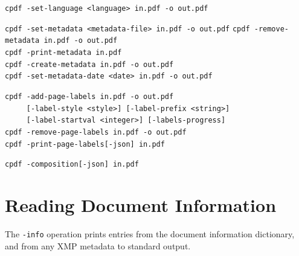\documentclass{book}
\begin{document}
\begin{framed}
    \vspace{1.5mm}
    \small\noindent\verb!cpdf -set-language <language> in.pdf -o out.pdf!

    \vspace{1.5mm}
    \small\noindent\verb!cpdf -set-metadata <metadata-file> in.pdf -o out.pdf!
    \small\noindent\verb!cpdf -remove-metadata in.pdf -o out.pdf!\\
    \small\noindent\verb!cpdf -print-metadata in.pdf!\\
    \small\noindent\verb!cpdf -create-metadata in.pdf -o out.pdf!\\
    \small\noindent\verb!cpdf -set-metadata-date <date> in.pdf -o out.pdf!
    
    \vspace{1.5mm}
    \small\noindent\verb!cpdf -add-page-labels in.pdf -o out.pdf!\\
    \noindent\verb!     [-label-style <style>] [-label-prefix <string>]!\\
    \noindent\verb!     [-label-startval <integer>] [-labels-progress]!\\
    
    \vspace{1.5mm}
    \small\noindent\verb!cpdf -remove-page-labels in.pdf -o out.pdf!\\
    \small\noindent\verb!cpdf -print-page-labels[-json] in.pdf!

    \vspace{1.5mm}
    \small\noindent\verb!cpdf -composition[-json] in.pdf!
  \end{framed}
 
\section{Reading Document Information}
\label{info}
The \texttt{-info} operation prints entries from the document information
dictionary, and from any XMP metadata to standard output.
\end{document}
